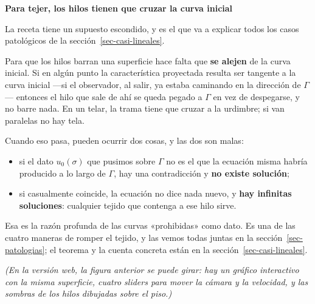 \documentclass[
  spanish,
  a4paper,
]{scrbook}
\providecommand{\tightlist}{%
  \setlength{\itemsep}{0pt}\setlength{\parskip}{0pt}}
\theoremstyle{definition}
\theoremstyle{plain}
\theoremstyle{definition}
\theoremstyle{plain}
\theoremstyle{definition}
\theoremstyle{remark}
\begin{document}
\begin{tcolorbox}[enhanced jigsaw, arc=.35mm, bottomrule=.15mm, breakable, colback=white, colframe=quarto-callout-important-color-frame, left=2mm, leftrule=.75mm, opacityback=0, rightrule=.15mm, toprule=.15mm]
\begin{minipage}[t]{5.5mm}
\textcolor{quarto-callout-important-color}{\faExclamation}
\end{minipage}%
\begin{minipage}[t]{\textwidth - 5.5mm}

\vspace{-3mm}\textbf{Para tejer, los hilos tienen que cruzar la curva inicial}\vspace{3mm}

La receta tiene un supuesto escondido, y es el que va a explicar todos
los casos patológicos de la sección~\ref{sec-casi-lineales}.

Para que los hilos barran una superficie hace falta que \textbf{se
alejen} de la curva inicial. Si en algún punto la característica
proyectada resulta ser tangente a la curva inicial ---si el observador,
al salir, ya estaba caminando en la dirección de \(\Gamma\)--- entonces
el hilo que sale de ahí se queda pegado a \(\Gamma\) en vez de
despegarse, y no barre nada. En un telar, la trama tiene que cruzar a la
urdimbre; si van paralelas no hay tela.

Cuando eso pasa, pueden ocurrir dos cosas, y las dos son malas:

\begin{itemize}
\tightlist
\item
  si el dato \(u_0(\sigma)\) que pusimos sobre \(\Gamma\) no es el que
  la ecuación misma habría producido a lo largo de \(\Gamma\), hay una
  contradicción y \textbf{no existe solución};
\item
  si casualmente coincide, la ecuación no dice nada nuevo, y \textbf{hay
  infinitas soluciones}: cualquier tejido que contenga a ese hilo sirve.
\end{itemize}

Esa es la razón profunda de las curvas «prohibidas» como dato. Es una de
las cuatro maneras de romper el tejido, y las vemos todas juntas en la
sección~\ref{sec-patologias}; el teorema y la cuenta concreta están en
la sección~\ref{sec-casi-lineales}.

\end{minipage}%
\end{tcolorbox}

\emph{(En la versión web, la figura anterior se puede girar: hay un
gráfico interactivo con la misma superficie, cuatro sliders para mover
la cámara y la velocidad, y las sombras de los hilos dibujadas sobre el
piso.)}
\end{document}

